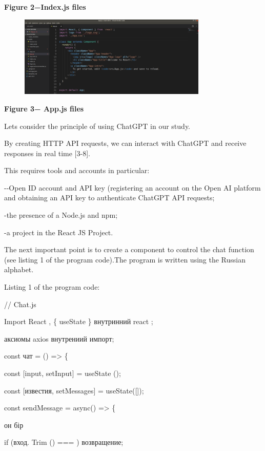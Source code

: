 {\bfseries Figure 2−Index.js files}

\begin{figure}[H]
	\centering
	\includegraphics[width=0.8\textwidth]{assets/128}
	\caption*{}
\end{figure}

{\bfseries Figure 3− App.js files}

Let\textquotesingle s consider the principle of using ChatGPT in our
study.

By creating HTTP API requests, we can interact with ChatGPT and receive
responses in real time {[}3-8{]}.

This requires tools and accounts in particular:

-\/-Open ID account and API key (registering an account on the Open AI
platform and obtaining an API key to authenticate ChatGPT API requests;

-the presence of a Node.js and npm;

-a project in the React JS Project.

The next important point is to create a component to control the chat
function (see listing 1 of the program code).The program is written
using the Russian alphabet.

Listing 1 of the program code:

// Chat.js

Import React , \{ useState \} внутринний
\textquotesingle react\textquotesingle{} ;

аксиомы \textquotesingle axios\textquotesingle{} внутрениий импорт;

const чат = () =\textgreater{} \{

const {[}input, setInput{]} = useState
(\textquotesingle\textquotesingle);

const {[}известия, setMessages{]} = useState({[}{]});

const sendMessage = async() =\textgreater{} \{

он бір

if (вход. Trim () === \textquotesingle\textquotesingle) возвращение;

